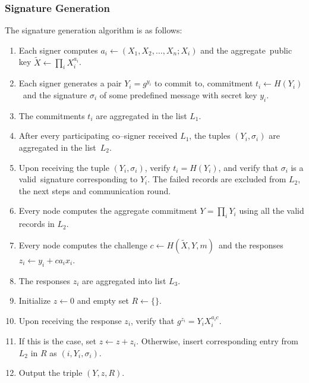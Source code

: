 \subsubsection{Signature Generation}
The signature generation algorithm is as follows:
\begin{enumerate}
    \item Each signer computes ${a_i\leftarrow(X_1,X_2,\dots,X_n;X_i)}$ and the aggregate\
    public key ${\tilde{X}\leftarrow\prod_i X_i^{a_i}}$.
    \item Each signer generates a pair $Y_i=g^{y_i}$ to commit to, commitment ${t_i\leftarrow H(Y_i)}$\
    and the signature $\sigma_i$ of some predefined message with secret key $y_i$.
    \item The commitments $t_i$ are aggregated in the list $L_1$.
    \item After every participating co--signer received $L_1$, the tuples ${(Y_i,\sigma_i)}$ are aggregated in the list\
    $L_2$.
    \item Upon receiving the tuple ${(Y_i,\sigma_i)}$, verify ${t_i = H(Y_i)}$, and verify that $\sigma_i$ is a valid\
    signature corresponding to $Y_i$.
    The failed records are excluded from $L_2$, the next steps and communication round.
    \item Every node computes the aggregate commitment ${Y=\prod_i Y_i}$ using all the valid records in $L_2$.
    \item Every node computes the challenge ${c\leftarrow H(\tilde{X}, Y, m)}$\
    and the responses ${z_i\leftarrow y_i + ca_ix_i}$.
    \item The responses $z_i$ are aggregated into list $L_3$.
    \item Initialize $z\leftarrow 0$ and empty set $R\leftarrow\{\}$.
    \item Upon receiving the response $z_i$, verify that ${g^{z_i} = Y_i X_i^{a_ic}}$.
    \item If this is the case, set ${z\leftarrow z+z_i}$.
    Otherwise, insert corresponding entry from $L_2$ in $R$ as ${(i, Y_i, \sigma_i)}$.
    \item Output the triple ${(Y,z,R)}$.
\end{enumerate}

